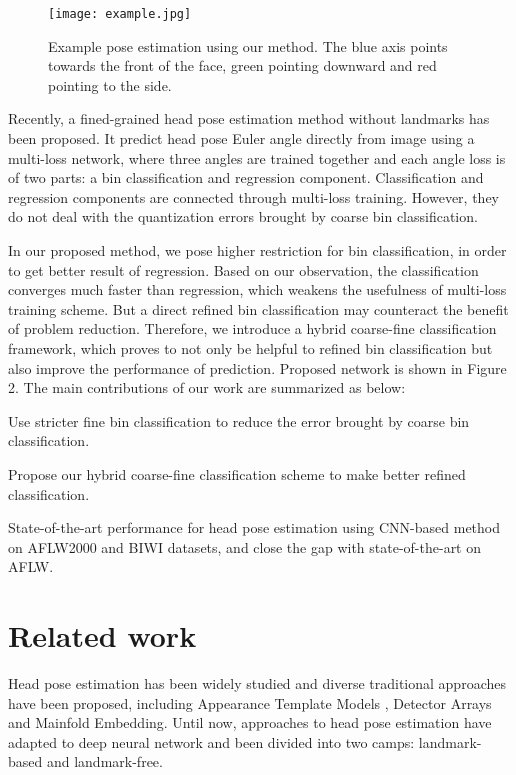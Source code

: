 \documentclass{article}
\begin{document}
\begin{CJK*}{UTF8}{gkai}
\begin {figure}[H]
\centering
\texttt{[image: example.jpg]}
\caption{Example pose estimation using our method. The blue axis points towards the front of the face, green pointing downward and red pointing to the side.}
\end {figure}

Recently, a fined-grained head pose estimation method\cite{ruiz2017fine} without landmarks has been proposed. It predict head pose Euler angle directly from image using a multi-loss network, where three angles are trained together and each angle loss is of two parts: a bin classification and regression component. Classification and regression components are connected through multi-loss training. However, they do not deal with the quantization errors brought by coarse bin classification. 

In our proposed method, we pose higher restriction for bin classification, in order to get better result of regression. Based on our observation, the classification converges much faster than regression, which weakens the usefulness of multi-loss training scheme. But a direct refined bin classification may counteract the benefit of problem reduction. Therefore, we introduce a hybrid coarse-fine classification framework, which proves to not only be helpful to refined bin classification but also improve the performance of prediction. Proposed network is shown in Figure 2. The main contributions of our work are summarized as below: 

 Use stricter fine bin classification to reduce the error brought by coarse bin classification. 

 Propose our hybrid coarse-fine classification scheme to make better refined classification. 

 State-of-the-art performance for head pose estimation using CNN-based method on AFLW2000 and BIWI datasets, and close the gap with state-of-the-art on AFLW.

\section{Related work}
\label{sec:format}

Head pose estimation has been widely studied and diverse traditional approaches have been proposed, including Appearance Template Models \cite{huang1998face}, Detector Arrays\cite{osuna1997training} and Mainfold Embedding\cite{balasubramanian2007biased}. Until now, approaches to head pose estimation have adapted to deep neural network and been divided into two camps: landmark-based and landmark-free.


\end{CJK*}
\end{document}
